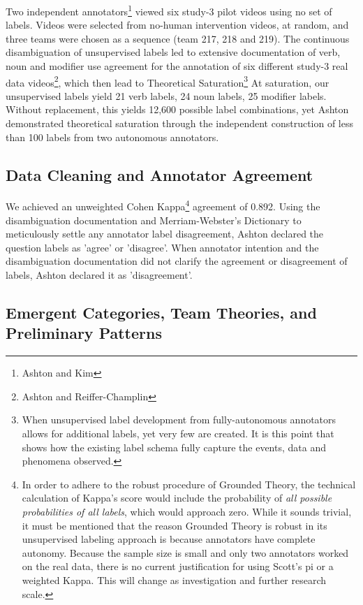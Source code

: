 \documentclass[10pt]{article}
\begin{document}
Two independent annotators\footnote{Ashton and Kim} viewed six study-3 pilot videos using no set of labels. Videos were selected from no-human intervention videos, at random, and three teams were chosen as a sequence (team 217, 218 and 219). The continuous disambiguation of unsupervised labels led to extensive documentation of verb, noun and modifier use agreement for the annotation of six different study-3 real data videos\footnote{Ashton and Reiffer-Champlin}, which then lead to Theoretical Saturation\footnote{When unsupervised label development from fully-autonomous annotators allows for additional labels, yet very few are created. It is this point that shows how the existing label schema fully capture the events, data and phenomena observed.}  At saturation, our unsupervised labels yield 21 verb labels, 24 noun labels, 25 modifier labels. Without replacement, this yields 12,600 possible label combinations, yet Ashton demonstrated theoretical saturation through the independent construction of less than 100 labels from two autonomous annotators.


\subsection{Data Cleaning and Annotator Agreement}
We achieved an unweighted Cohen Kappa\footnote{In order to adhere to the robust procedure of Grounded Theory, the technical calculation of Kappa's score would include the probability of \textit{all possible probabilities of all labels}, which would approach zero. While it sounds trivial, it must be mentioned that the reason Grounded Theory is robust in its unsupervised labeling approach is because annotators have complete autonomy. Because the sample size is small and only two annotators worked on the real data, there is no current justification for using Scott's pi or a weighted Kappa. This will change as investigation and further research scale.} agreement of 0.892. Using the disambiguation documentation and Merriam-Webster's Dictionary to meticulously settle any annotator label disagreement, Ashton declared the question labels as 'agree' or 'disagree'. When annotator intention and the disambiguation documentation did not clarify the agreement or disagreement of labels, Ashton declared it as 'disagreement'. 



\subsection{Emergent Categories, Team Theories, and Preliminary Patterns}
\end{document}
